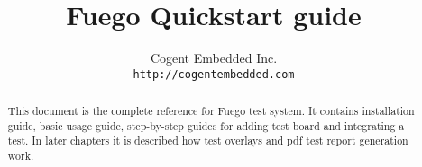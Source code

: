 \documentclass{article}
\title{Fuego Quickstart guide}
\author{Cogent Embedded Inc.\\ \texttt{http://cogentembedded.com}}
\begin{document}
\maketitle
\newpage

\begin{abstract}
  This document is the complete reference for Fuego test system. It contains installation guide, basic usage guide, step-by-step guides for adding test board and integrating a test. In later chapters it is described how test overlays and pdf test report generation work.
\end{abstract}

\newpage
\tableofcontents
\newpage

\newpage

\newpage

\newpage

\newpage

\newpage

\newpage

\newpage

\newpage

\end{document}
